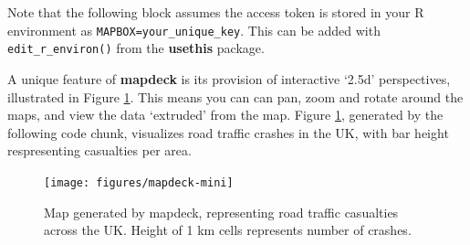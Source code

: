 \documentclass[]{krantz}
\newenvironment{Shaded}{\begin{snugshade}}{\end{snugshade}}
\newcommand{\DataTypeTok}[1]{\textcolor[rgb]{0.27,0.27,0.27}{#1}}
\newcommand{\DecValTok}[1]{\textcolor[rgb]{0.06,0.06,0.06}{#1}}
\newcommand{\KeywordTok}[1]{\textcolor[rgb]{0.27,0.27,0.27}{\textbf{#1}}}
\newcommand{\NormalTok}[1]{#1}
\newcommand{\OperatorTok}[1]{\textcolor[rgb]{0.43,0.43,0.43}{\textbf{#1}}}
\newcommand{\StringTok}[1]{\textcolor[rgb]{0.5,0.5,0.5}{#1}}
\let\BeginKnitrBlock\begin \let\EndKnitrBlock\end
\begin{document}
\BeginKnitrBlock{rmdnote}
Note that the following block assumes the access token is stored in your R environment as \texttt{MAPBOX=your\_unique\_key}.
This can be added with \texttt{edit\_r\_environ()} from the \textbf{usethis} package.
\EndKnitrBlock{rmdnote}

A unique feature of \textbf{mapdeck} is its provision of interactive `2.5d' perspectives, illustrated in Figure \ref{fig:mapdeck}.
This means you can can pan, zoom and rotate around the maps, and view the data `extruded' from the map.
Figure \ref{fig:mapdeck}, generated by the following code chunk, visualizes road traffic crashes in the UK, with bar height respresenting casualties per area.

\begin{Shaded}
\end{Shaded}

\begin{figure}[t]

{\centering \texttt{[image: figures/mapdeck-mini]} 

}

\caption[Map generated by mapdeck.]{Map generated by mapdeck, representing road traffic casualties across the UK. Height of 1 km cells represents number of crashes.}\label{fig:mapdeck}
\end{figure}
\end{document}
